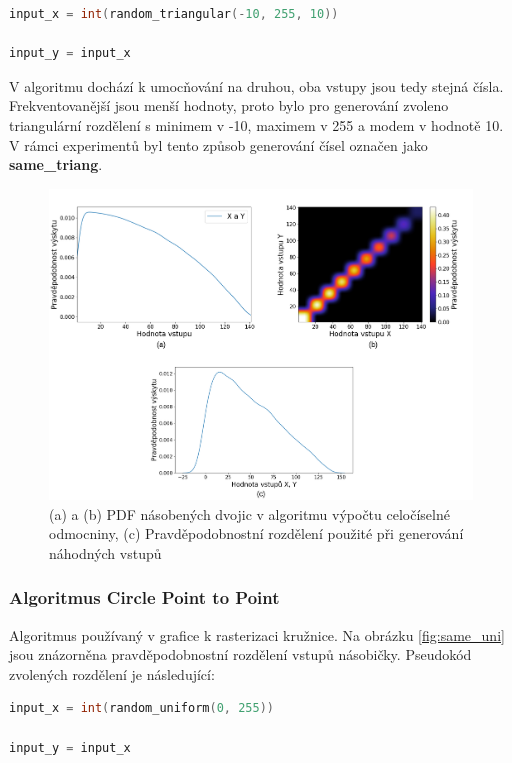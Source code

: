 \begin{lstlisting}[language={C}, label={lst:isqrt}]
input_x = int(random_triangular(-10, 255, 10))

input_y = input_x
\end{lstlisting}

V algoritmu dochází k umocňování na druhou, oba vstupy jsou tedy stejná čísla. Frekventovanější jsou menší hodnoty, proto bylo pro generování zvoleno triangulární rozdělení s minimem v -10, maximem v 255 a modem v hodnotě 10. V rámci experimentů byl tento způsob generování čísel označen jako \textbf{same\_triang}.

\begin{figure}[H]
    \centering
    \includegraphics[width=\textwidth]{obrazky-figures/same_triang_all.png}
    \caption{(a) a (b) PDF násobených dvojic v algoritmu výpočtu celočíselné odmocniny, (c) Pravděpodobnostní rozdělení použité při generování náhodných vstupů}
    \label{fig:same_triang}
\end{figure}

\pagebreak

\subsubsection{Algoritmus Circle Point to Point}
Algoritmus používaný v grafice k rasterizaci kružnice. Na obrázku \ref{fig:same_uni} jsou znázorněna pravděpodobnostní rozdělení vstupů násobičky. Pseudokód zvolených rozdělení je následující:

\begin{lstlisting}[language={C}, label={lst:circle}]
input_x = int(random_uniform(0, 255))

input_y = input_x
\end{lstlisting}

